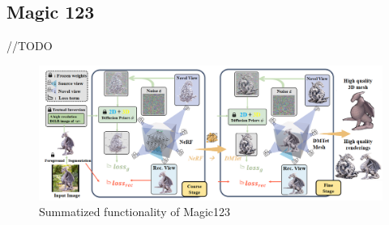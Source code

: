 \subsection{Magic 123}
\label{Magic123}

//TODO

\begin{figure}[ht]
    \centering
      \includegraphics[width=1\columnwidth]{figures/Magic123.png}
      \caption{Summatized functionality of Magic123}\label{fig:figureMagic123}
\end{figure}